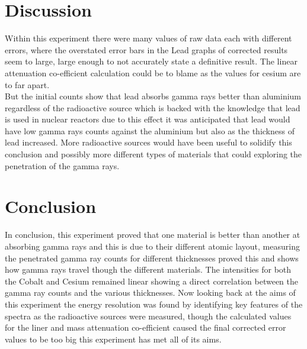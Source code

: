 \documentclass[12pt]{article}
\begin{document}
\newpage
\section{Discussion}
\label{Disscussion Section}

Within this experiment there were many values of raw data each with different errors, where the overstated error bars in the Lead graphs of corrected results seem to large, large enough to not accurately state a definitive result. The linear attenuation co-efficient calculation could be to blame as the values for cesium are to far apart. \\

But the initial counts show that lead absorbs gamma rays better than aluminium regardless of the radioactive source which is backed with the knowledge that lead is used in nuclear reactors due to this effect it was anticipated that lead would have low gamma rays counts against the aluminium but also as the thickness of lead increased. More radioactive sources would have been useful to solidify this conclusion and possibly more different types of materials that could exploring the penetration of the gamma rays.

\section{Conclusion}
\label{Conclusion Section}

In conclusion, this experiment proved that one material is better than another at absorbing gamma rays and this is due to their different atomic layout, measuring the penetrated gamma ray counts for different thicknesses proved this and shows how gamma rays travel though the different materials. The intensities for both the Cobalt and Cesium remained linear showing a direct correlation between the gamma ray counts and the various thicknesses. Now looking back at the aims of this experiment the energy resolution was found by identifying key features of the spectra as the radioactive sources were measured, though the calculated values for the liner and mass attenuation co-efficient caused the final corrected error values to be too big this experiment has met all of its aims.
\end{document}
